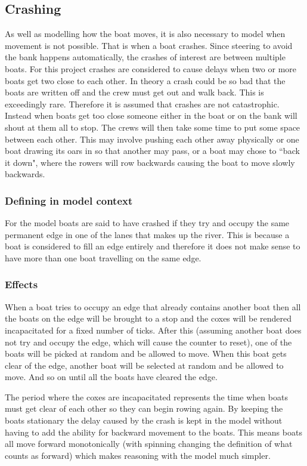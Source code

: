       \subsection{Crashing}\label{model:movement:crashing}
      As well as modelling how the boat moves, it is also necessary to model when movement is not possible. That is when a boat crashes. Since steering to avoid the bank happens automatically, the crashes of interest are between multiple boats. For this project crashes are considered to cause delays when two or more boats get two close to each other. In theory a crash could be so bad that the boats are written off and the crew must get out and walk back. This is exceedingly rare. Therefore it is assumed that crashes are not catastrophic. Instead when boats get too close someone either in the boat or on the bank will shout at them all to stop. The crews will then take some time to put some space between each other. This may involve pushing each other away physically or one boat drawing its oars in so that another may pass, or a boat may chose to ``back it down", where the rowers will row backwards causing the boat to move slowly backwards.
        
      \subsubsection{Defining in model context}
      For the model boats are said to have crashed if they try and occupy the same permanent edge in one of the lanes that makes up the river. This is because a boat is considered to fill an edge entirely and therefore it does not make sense to have more than one boat travelling on the same edge.

      \subsubsection{Effects}
      When a boat tries to occupy an edge that already contains another boat then all the boats on the edge will be brought to a stop and the coxes will be rendered incapacitated for a fixed number of ticks. After this (assuming another boat does not try and occupy the edge, which will cause the counter to reset), one of the boats will be picked at random and be allowed to move. When this boat gets clear of the edge, another boat will be selected at random and be allowed to move. And so on until all the boats have cleared the edge.
      
      The period where the coxes are incapacitated represents the time when boats must get clear of each other so they can begin rowing again. By keeping the boats stationary the delay caused by the crash is kept in the model without having to add the ability for backward movement to the boats. This means boats all move forward monotonically (with spinning changing the definition of what counts as forward) which makes reasoning with the model much simpler.
      
